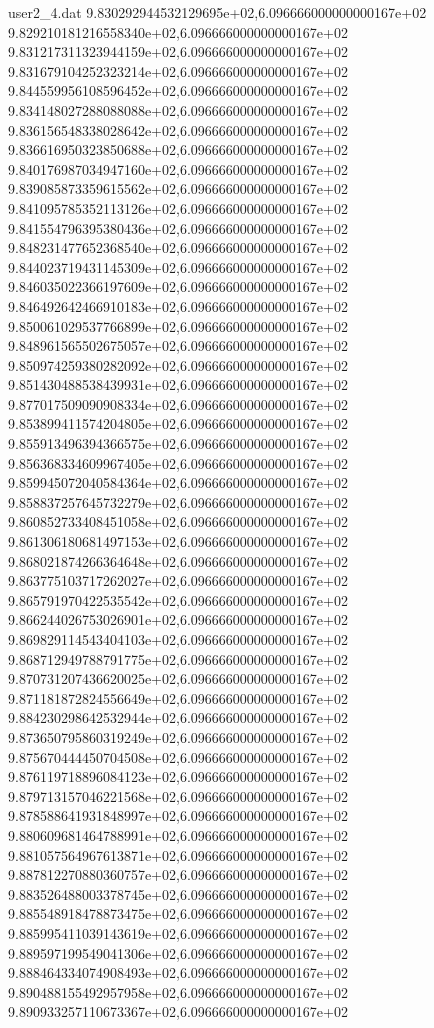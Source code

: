 \begin{filecontents}{user2_4.dat}
9.830292944532129695e+02,6.096666000000000167e+02
9.829210181216558340e+02,6.096666000000000167e+02
9.831217311323944159e+02,6.096666000000000167e+02
9.831679104252323214e+02,6.096666000000000167e+02
9.844559956108596452e+02,6.096666000000000167e+02
9.834148027288088088e+02,6.096666000000000167e+02
9.836156548338028642e+02,6.096666000000000167e+02
9.836616950323850688e+02,6.096666000000000167e+02
9.840176987034947160e+02,6.096666000000000167e+02
9.839085873359615562e+02,6.096666000000000167e+02
9.841095785352113126e+02,6.096666000000000167e+02
9.841554796395380436e+02,6.096666000000000167e+02
9.848231477652368540e+02,6.096666000000000167e+02
9.844023719431145309e+02,6.096666000000000167e+02
9.846035022366197609e+02,6.096666000000000167e+02
9.846492642466910183e+02,6.096666000000000167e+02
9.850061029537766899e+02,6.096666000000000167e+02
9.848961565502675057e+02,6.096666000000000167e+02
9.850974259380282092e+02,6.096666000000000167e+02
9.851430488538439931e+02,6.096666000000000167e+02
9.877017509090908334e+02,6.096666000000000167e+02
9.853899411574204805e+02,6.096666000000000167e+02
9.855913496394366575e+02,6.096666000000000167e+02
9.856368334609967405e+02,6.096666000000000167e+02
9.859945072040584364e+02,6.096666000000000167e+02
9.858837257645732279e+02,6.096666000000000167e+02
9.860852733408451058e+02,6.096666000000000167e+02
9.861306180681497153e+02,6.096666000000000167e+02
9.868021874266364648e+02,6.096666000000000167e+02
9.863775103717262027e+02,6.096666000000000167e+02
9.865791970422535542e+02,6.096666000000000167e+02
9.866244026753026901e+02,6.096666000000000167e+02
9.869829114543404103e+02,6.096666000000000167e+02
9.868712949788791775e+02,6.096666000000000167e+02
9.870731207436620025e+02,6.096666000000000167e+02
9.871181872824556649e+02,6.096666000000000167e+02
9.884230298642532944e+02,6.096666000000000167e+02
9.873650795860319249e+02,6.096666000000000167e+02
9.875670444450704508e+02,6.096666000000000167e+02
9.876119718896084123e+02,6.096666000000000167e+02
9.879713157046221568e+02,6.096666000000000167e+02
9.878588641931848997e+02,6.096666000000000167e+02
9.880609681464788991e+02,6.096666000000000167e+02
9.881057564967613871e+02,6.096666000000000167e+02
9.887812270880360757e+02,6.096666000000000167e+02
9.883526488003378745e+02,6.096666000000000167e+02
9.885548918478873475e+02,6.096666000000000167e+02
9.885995411039143619e+02,6.096666000000000167e+02
9.889597199549041306e+02,6.096666000000000167e+02
9.888464334074908493e+02,6.096666000000000167e+02
9.890488155492957958e+02,6.096666000000000167e+02
9.890933257110673367e+02,6.096666000000000167e+02

\end{filecontents}
